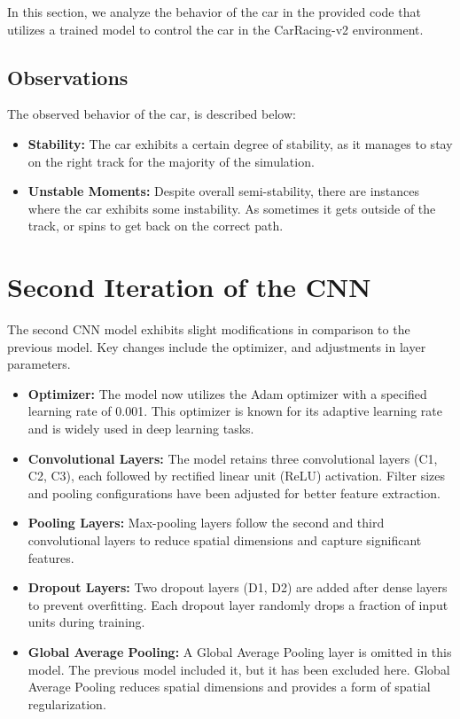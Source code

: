 \documentclass{article}
\begin{document}
In this section, we analyze the behavior of the car in the provided code that utilizes a trained model to control the car in the CarRacing-v2 environment.

\subsection{Observations}

The observed behavior of the car, is described below:

\begin{itemize}
    \item \textbf{Stability:} The car exhibits a certain degree of stability, as it manages to stay on the right track for the majority of the simulation.

    \item \textbf{Unstable Moments:} Despite overall semi-stability, there are instances where the car exhibits some instability. As sometimes it gets outside of the track, or spins to get back on the correct path.

\end{itemize}

\section{Second Iteration of the CNN}

The second CNN model exhibits slight modifications in comparison to the previous model. Key changes include the optimizer, and adjustments in layer parameters.

\begin{itemize}
    \item \textbf{Optimizer:} The model now utilizes the Adam optimizer with a specified learning rate of 0.001. This optimizer is known for its adaptive learning rate and is widely used in deep learning tasks.

    \item \textbf{Convolutional Layers:} The model retains three convolutional layers (C1, C2, C3), each followed by rectified linear unit (ReLU) activation. Filter sizes and pooling configurations have been adjusted for better feature extraction.

    \item \textbf{Pooling Layers:} Max-pooling layers follow the second and third convolutional layers to reduce spatial dimensions and capture significant features.

    \item \textbf{Dropout Layers:} Two dropout layers (D1, D2) are added after dense layers to prevent overfitting. Each dropout layer randomly drops a fraction of input units during training.

    \item \textbf{Global Average Pooling:} A Global Average Pooling layer is omitted in this model. The previous model included it, but it has been excluded here. Global Average Pooling reduces spatial dimensions and provides a form of spatial regularization.

\end{itemize}
\end{document}
